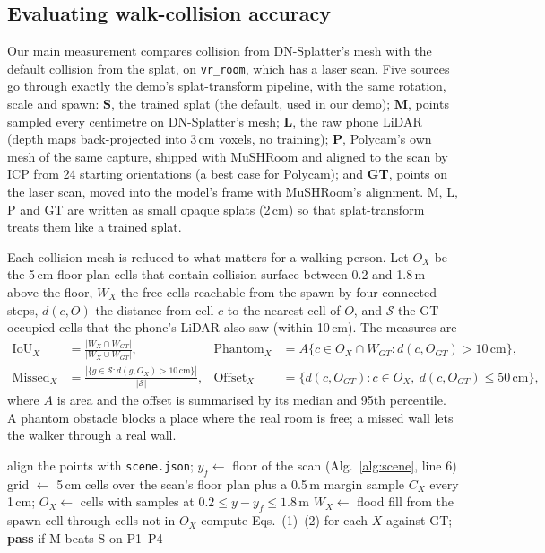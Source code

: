 \subsection{Evaluating walk-collision accuracy}
\label{sec:collision-method}
Our main measurement compares collision from DN-Splatter's mesh with the default collision from the splat, on \texttt{vr\_room}, which has a laser scan. Five sources go through exactly the demo's splat-transform pipeline, with the same rotation, scale and spawn:
\textbf{S}, the trained splat (the default, used in our demo);
\textbf{M}, points sampled every centimetre on DN-Splatter's mesh;
\textbf{L}, the raw phone LiDAR (depth maps back-projected into 3\,cm voxels, no training);
\textbf{P}, Polycam's own mesh of the same capture, shipped with MuSHRoom and aligned to the scan by ICP from 24 starting orientations (a best case for Polycam); and
\textbf{GT}, points on the laser scan, moved into the model's frame with MuSHRoom's alignment.
M, L, P and GT are written as small opaque splats (2\,cm) so that splat-transform treats them like a trained splat.

Each collision mesh is reduced to what matters for a walking person. Let $O_X$ be the 5\,cm floor-plan cells that contain collision surface between 0.2 and 1.8\,m above the floor, $W_X$ the free cells reachable from the spawn by four-connected steps, $d(c, O)$ the distance from cell $c$ to the nearest cell of $O$, and $\mathcal{S}$ the GT-occupied cells that the phone's LiDAR also saw (within 10\,cm). The measures are
\begin{align}
\mathrm{IoU}_X &= \frac{|W_X \cap W_{GT}|}{|W_X \cup W_{GT}|}, &
\mathrm{Phantom}_X &= A\{c \in O_X \cap W_{GT} : d(c, O_{GT}) > 10\,\mathrm{cm}\}, \\
\mathrm{Missed}_X &= \frac{|\{g \in \mathcal{S} : d(g, O_X) > 10\,\mathrm{cm}\}|}{|\mathcal{S}|}, &
\mathrm{Offset}_X &= \{d(c, O_{GT}) : c \in O_X,\ d(c, O_{GT}) \le 50\,\mathrm{cm}\},
\end{align}
where $A$ is area and the offset is summarised by its median and 95th percentile. A phantom obstacle blocks a place where the real room is free; a missed wall lets the walker through a real wall.

\begin{algorithm}[!htb]
	\caption{Walk-collision accuracy against a laser scan}
	\label{alg:collision}
	\begin{algorithmic}[1]
		\State align the points with \texttt{scene.json}; $y_f \gets$ floor of the scan (Alg.~\ref{alg:scene}, line 6)
		\State grid $\gets$ 5\,cm cells over the scan's floor plan plus a 0.5\,m margin
			\State sample $C_X$ every 1\,cm; $O_X \gets$ cells with samples at $0.2 \le y - y_f \le 1.8$\,m
			\State $W_X \gets$ flood fill from the spawn cell through cells not in $O_X$
		\EndFor
		\State compute Eqs.~(1)--(2) for each $X$ against GT; \textbf{pass} if M beats S on P1--P4
		\EndProcedure
	\end{algorithmic}
\end{algorithm}

